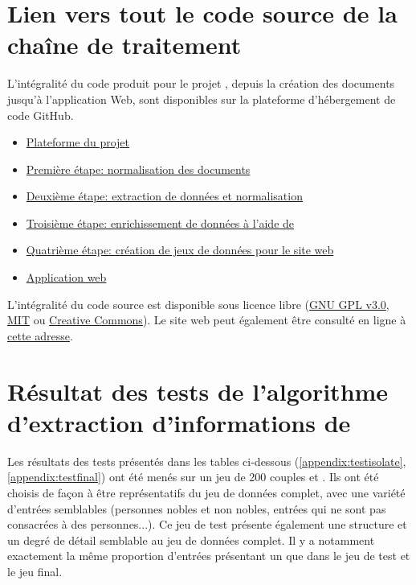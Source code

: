 
\appendix
\chapter{Lien vers tout le code source de la chaîne de traitement \ktb{}}
L'intégralité du code produit pour le projet \ktb{}, depuis la création des documents \tei{} jusqu'à l'application Web, sont disponibles sur la plateforme d'hébergement de code GitHub.
\begin{itemize}
	\item \href{https://github.com/katabase}{Plateforme du projet}
	\item \href{https://github.com/katabase/1_OutputData}{Première étape: normalisation des documents \tei{}}
	\item \href{https://github.com/katabase/2_CleanedData}{Deuxième étape: extraction de données et normalisation}
	\item \href{https://github.com/katabase/3_WikidataEnrichment}{Troisième étape: enrichissement de données à l'aide de \wkd{}}
	\item \href{https://github.com/katabase/4_TaggedData}{Quatrième étape: création de jeux de données \json{} pour le site web}
	\item \href{https://github.com/katabase/Application}{Application web \ktb{}}
\end{itemize}

L'intégralité du code source est disponible sous licence libre (\href{https://www.gnu.org/licenses/gpl-3.0.html}{GNU GPL v3.0}, \href{https://mit-license.org/}{MIT} ou \href{https://creativecommons.org/}{Creative Commons}). Le site web peut également être consulté en ligne à \href{https://katabase.huma-num.fr/}{cette adresse}.

\chapter{Résultat des tests de l'algorithme d'extraction d'informations de \wkd{}}

Les résultats des tests présentés dans les tables ci-dessous (\ref{appendix:testisolate}, \ref{appendix:testfinal}) ont été menés sur un jeu de 200 couples \tname{} et \ttrait{}. Ils ont été choisis de façon à être représentatifs du jeu de données complet, avec une variété d'entrées semblables (personnes nobles et non nobles, entrées qui ne sont pas consacrées à des personnes...). Ce jeu de test présente également une structure et un degré de détail semblable au jeu de données complet. Il y a notamment exactement la même proportion d'entrées présentant un \ttrait{} que dans le jeu de test et le jeu final.


